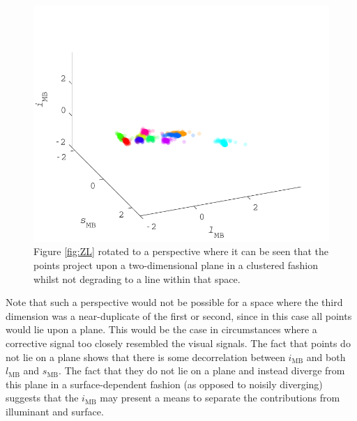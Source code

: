 \begin{figure}[htbp] %
\includegraphics[max width=\textwidth]{figs/comp/thirdDimension/viewpoint.pdf}
 \caption{Figure \ref{fig:ZL} rotated to a perspective where it can be seen that the points project upon a two-dimensional plane in a clustered fashion whilst not degrading to a line within that space.}
 \label{fig:viewpoint}
\end{figure} 

Note that such a perspective would not be possible for a space where the third dimension was a near-duplicate of the first or second, since in this case all points would lie upon a plane. This would be the case in circumstances where a corrective signal too closely resembled the visual signals. The fact that points do not lie on a plane shows that there is some decorrelation between $i_{\text{MB}}$ and both $l_{\text{MB}}$ and $s_{\text{MB}}$. The fact that they do not lie on a plane and instead diverge from this plane in a surface-dependent fashion (as opposed to noisily diverging) suggests that the $i_{\text{MB}}$ may present a means to separate the contributions from illuminant and surface. 



